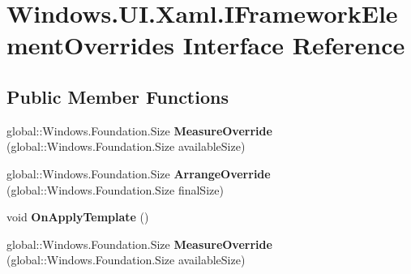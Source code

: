 \hypertarget{interface_windows_1_1_u_i_1_1_xaml_1_1_i_framework_element_overrides}{}\section{Windows.\+U\+I.\+Xaml.\+I\+Framework\+Element\+Overrides Interface Reference}
\label{interface_windows_1_1_u_i_1_1_xaml_1_1_i_framework_element_overrides}
\subsection*{Public Member Functions}
\begin{DoxyCompactItemize}
\item 
\mbox{\label{interface_windows_1_1_u_i_1_1_xaml_1_1_i_framework_element_overrides_aeda95cec8a5d4e5c11ee9e9f89d8e4bb}} 
global\+::\+Windows.\+Foundation.\+Size {\bfseries Measure\+Override} (global\+::\+Windows.\+Foundation.\+Size available\+Size)
\item 
\mbox{\label{interface_windows_1_1_u_i_1_1_xaml_1_1_i_framework_element_overrides_a1755b4523f8e37b7d2f6dcecf9a1130d}} 
global\+::\+Windows.\+Foundation.\+Size {\bfseries Arrange\+Override} (global\+::\+Windows.\+Foundation.\+Size final\+Size)
\item 
\mbox{\label{interface_windows_1_1_u_i_1_1_xaml_1_1_i_framework_element_overrides_aff9905818ed4b083633d3faf19ee329b}} 
void {\bfseries On\+Apply\+Template} ()
\item 
\mbox{\label{interface_windows_1_1_u_i_1_1_xaml_1_1_i_framework_element_overrides_aeda95cec8a5d4e5c11ee9e9f89d8e4bb}} 
global\+::\+Windows.\+Foundation.\+Size {\bfseries Measure\+Override} (global\+::\+Windows.\+Foundation.\+Size available\+Size)
\item 
\mbox{\label{interface_windows_1_1_u_i_1_1_xaml_1_1_i_framework_element_overrides_a1755b4523f8e37b7d2f6dcecf9a1130d}} 

\end{DoxyCompactItemize}
